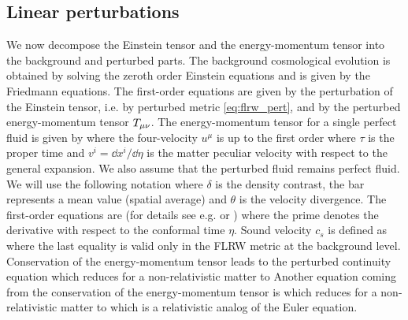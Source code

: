 \subsection{Linear perturbations}
We now decompose the Einstein tensor and the energy-momentum tensor into the background and perturbed parts. The background cosmological evolution is obtained by solving the zeroth order Einstein equations and is given by the Friedmann equations. The first-order equations are given by the perturbation of the Einstein tensor, i.e. by perturbed metric \eqref{eq:flrw_pert}, and by the perturbed energy-momentum tensor $T_{\mu\nu}$. The energy-momentum tensor for a single perfect fluid is given by
where the four-velocity $u^\mu$ is up to the first order
where $\tau$ is the proper time and $v^i=\dd x^i/\dd\eta$ is the matter peculiar velocity with respect to the general expansion. We also assume that the perturbed fluid remains perfect fluid. We will use the following notation
where $\delta$ is the density contrast, the bar represents a mean value (spatial average) and $\theta$ is the velocity divergence. The first-order equations are (for details see e.g. \cite{2002col.luc..cosmology} or \cite{10.1143/PTPS.78.1})
where the prime denotes the derivative with respect to the conformal time $\eta$. Sound velocity $c_s$ is defined as
where the last equality is valid only in the FLRW metric at the background level. Conservation of the energy-momentum tensor leads to the perturbed continuity equation
which reduces for a non-relativistic matter to
Another equation coming from the conservation of the energy-momentum tensor is
which reduces for a non-relativistic matter to
which is a relativistic analog of the Euler equation.


